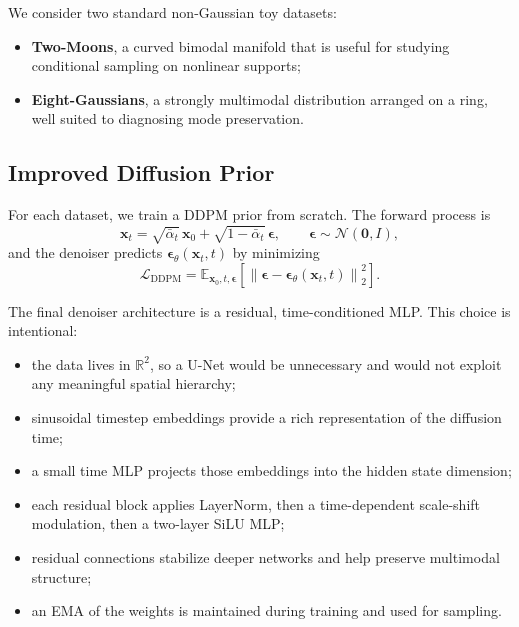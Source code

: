 \documentclass[10pt,twocolumn]{article}
\begin{document}
We consider two standard non-Gaussian toy datasets:
\begin{itemize}[leftmargin=1.5em]
    \item \textbf{Two-Moons}, a curved bimodal manifold that is useful for studying conditional sampling on nonlinear supports;
    \item \textbf{Eight-Gaussians}, a strongly multimodal distribution arranged on a ring, well suited to diagnosing mode preservation.
\end{itemize}

\subsection{Improved Diffusion Prior}

For each dataset, we train a DDPM prior from scratch. The forward process is
\begin{equation}
\mathbf{x}_t = \sqrt{\bar{\alpha}_t}\,\mathbf{x}_0 + \sqrt{1-\bar{\alpha}_t}\,\boldsymbol{\epsilon},
\qquad
\boldsymbol{\epsilon} \sim \mathcal{N}(\mathbf{0}, I),
\end{equation}
and the denoiser predicts \(\boldsymbol{\epsilon}_\theta(\mathbf{x}_t,t)\) by minimizing
\begin{equation}
\mathcal{L}_{\mathrm{DDPM}}
=
\mathbb{E}_{\mathbf{x}_0, t, \boldsymbol{\epsilon}}
\left[
\left\|
\boldsymbol{\epsilon} - \boldsymbol{\epsilon}_\theta(\mathbf{x}_t,t)
\right\|_2^2
\right].
\end{equation}

The final denoiser architecture is a residual, time-conditioned MLP. This choice is intentional:
\begin{itemize}[leftmargin=1.5em]
    \item the data lives in \(\mathbb{R}^2\), so a U-Net would be unnecessary and would not exploit any meaningful spatial hierarchy;
    \item sinusoidal timestep embeddings provide a rich representation of the diffusion time;
    \item a small time MLP projects those embeddings into the hidden state dimension;
    \item each residual block applies LayerNorm, then a time-dependent scale-shift modulation, then a two-layer SiLU MLP;
    \item residual connections stabilize deeper networks and help preserve multimodal structure;
    \item an EMA of the weights is maintained during training and used for sampling.
\end{itemize}
\end{document}
